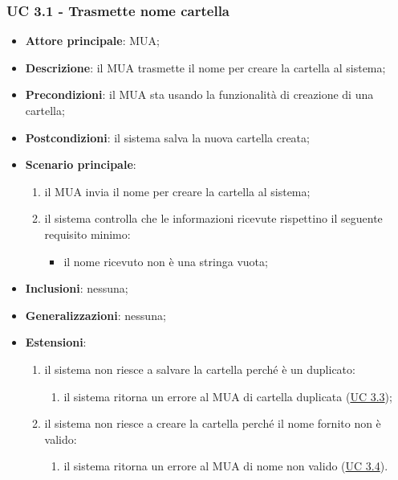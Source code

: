 \subsubsection{UC 3.1 - Trasmette nome cartella} \label{sec:UC3.1}
    \begin{itemize}
        \item \textbf{Attore principale}: MUA;
        \item \textbf{Descrizione}: il MUA trasmette il nome per creare la cartella al sistema;
        \item \textbf{Precondizioni}: il MUA sta usando la funzionalità di creazione di una cartella;
        \item \textbf{Postcondizioni}: il sistema salva la nuova cartella creata;
        \item \textbf{Scenario principale}:
            \begin{enumerate}
                \item il MUA invia il nome per creare la cartella al sistema;
                \item il sistema controlla che le informazioni ricevute rispettino il seguente requisito minimo:
                \begin{itemize}
                    \item il nome ricevuto non è una stringa vuota;
                \end{itemize}
            \end{enumerate}
        \item \textbf{Inclusioni}: nessuna;
        \item \textbf{Generalizzazioni}: nessuna;
        \item \textbf{Estensioni}:
            \begin{enumerate}[label=\alph*.]
                \item il sistema non riesce a salvare la cartella perché è un duplicato:
                \begin{enumerate}[label=\arabic*.]
                    \item il sistema ritorna un errore al MUA di cartella duplicata (\hyperref[sec:UC3.3]{UC 3.3});
                \end{enumerate}
                \item il sistema non riesce a creare la cartella perché il nome fornito non è valido:
                \begin{enumerate}[label=\arabic*.]
                    \item il sistema ritorna un errore al MUA di nome non valido (\hyperref[sec:UC3.4]{UC 3.4}).
                \end{enumerate}
            \end{enumerate}
    \end{itemize}

